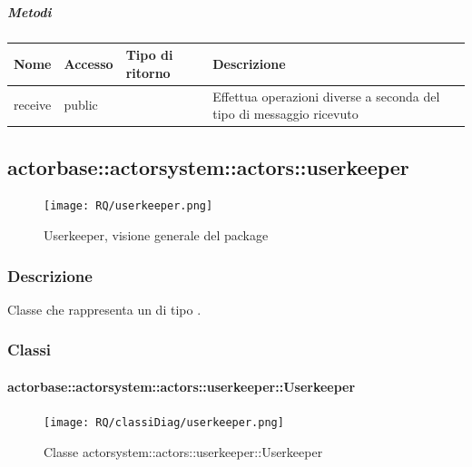 \documentclass{scalatekids-article}
\begin{document}
\subparagraph{Metodi}

\begin{tabular}{| l | l | l | l |}
  \hline
  Nome & Accesso & Tipo di ritorno & Descrizione\\
  \hline
  receive & public &  & Effettua operazioni diverse a seconda del tipo di messaggio ricevuto\\
  \hline
\end{tabular}


\subsection{actorbase::actorsystem::actors::userkeeper}
\label{sec:actorbase::actorsystem::actors::userkeeper}

\begin{figure}[H]
  \begin{center}
    \texttt{[image: RQ/userkeeper.png]}
    \caption{Userkeeper, visione generale del package}
  \end{center}
\end{figure}

\subsubsection{Descrizione}
Classe che rappresenta un  di tipo .

\subsubsection{Classi}

\paragraph{actorbase::actorsystem::actors::userkeeper::Userkeeper}
\label{sec:actorbase::actorsystem::actors::userkeeper::Userkeeper}

\begin{figure}[H]
  \begin{center}
    \texttt{[image: RQ/classiDiag/userkeeper.png]}
    \caption{Classe actorsystem::actors::userkeeper::Userkeeper}
  \end{center}
\end{figure}
\end{document}

